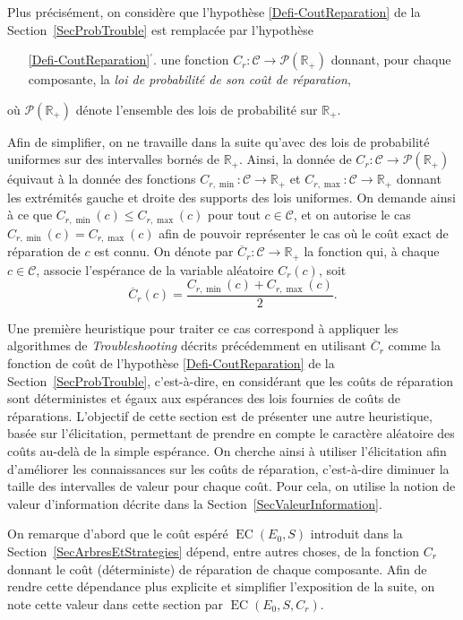 \documentclass[a4paper,11pt]{article}
\theoremstyle{plain}
\theoremstyle{definition}
\DeclareMathOperator{\EC}{EC}
\begin{document}
Plus précisément, on considère que l'hypothèse \ref{Defi-CoutReparation} de la Section~\ref{SecProbTrouble} est remplacée par l'hypothèse
\begin{enumerate}
\item[\ref{Defi-CoutReparation}$^\prime$.] une fonction $C_r: \mathcal C \to \mathcal P(\mathbb R_+)$ donnant, pour chaque composante, la \emph{loi de probabilité de son coût de réparation},
\end{enumerate}
où $\mathcal P(\mathbb R_+)$ dénote l'ensemble des lois de probabilité sur $\mathbb R_+$.

Afin de simplifier, on ne travaille dans la suite qu'avec des lois de probabilité uniformes sur des intervalles bornés de $\mathbb R_+$. Ainsi, la donnée de $C_r: \mathcal C \to \mathcal P(\mathbb R_+)$ équivaut à la donnée des fonctions $C_{r, \min}: \mathcal C \to \mathbb R_+$ et $C_{r, \max}: \mathcal C \to \mathbb R_+$ donnant les extrémités gauche et droite des supports des lois uniformes. On demande ainsi à ce que $C_{r, \min}(c) \leq C_{r, \max}(c)$ pour tout $c \in \mathcal C$, et on autorise le cas $C_{r, \min}(c) = C_{r, \max}(c)$ afin de pouvoir représenter le cas où le coût exact de réparation de $c$ est connu. On dénote par $\overline C_r: \mathcal C \to \mathbb R_+$ la fonction qui, à chaque $c \in \mathcal C$, associe l'espérance de la variable aléatoire $C_r(c)$, soit
\[\overline C_r(c) = \frac{C_{r, \min}(c) + C_{r, \max}(c)}{2}.\]

Une première heuristique pour traiter ce cas correspond à appliquer les algorithmes de \emph{Troubleshooting} décrits précédemment en utilisant $\overline C_r$ comme la fonction de coût de l'hypothèse \ref{Defi-CoutReparation} de la Section~\ref{SecProbTrouble}, c'est-à-dire, en considérant que les coûts de réparation sont déterministes et égaux aux espérances des lois fournies de coûts de réparations. L'objectif de cette section est de présenter une autre heuristique, basée sur l'élicitation, permettant de prendre en compte le caractère aléatoire des coûts au-delà de la simple espérance. On cherche ainsi à utiliser l'élicitation afin d'améliorer les connaissances sur les coûts de réparation, c'est-à-dire diminuer la taille des intervalles de valeur pour chaque coût. Pour cela, on utilise la notion de valeur d'information décrite dans la Section~\ref{SecValeurInformation}.

On remarque d'abord que le coût espéré $\EC(E_0, S)$ introduit dans la Section~\ref{SecArbresEtStrategies} dépend, entre autres choses, de la fonction $C_r$ donnant le coût (déterministe) de réparation de chaque composante. Afin de rendre cette dépendance plus explicite et simplifier l'exposition de la suite, on note cette valeur dans cette section par $\EC(E_0, S, C_r)$.
\end{document}
